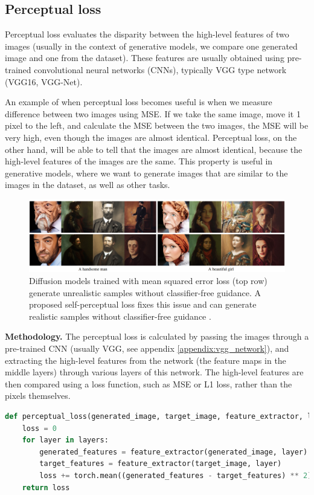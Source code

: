 \subsection{Perceptual loss}
\label{appendix:perceptual_loss}

Perceptual loss evaluates the disparity between the high-level features of two images (usually in the context of generative models, we compare one generated image and one from the dataset). These features are usually obtained using pre-trained convolutional neural networks (CNNs), typically VGG type network (VGG16, VGG-Net).

An example of when perceptual loss becomes useful is when we measure difference between two images using MSE. If we take the same image, move it 1 pixel to the left, and calculate the MSE between the two images, the MSE will be very high, even though the images are almost identical. Perceptual loss, on the other hand, will be able to tell that the images are almost identical, because the high-level features of the images are the same. This property is useful in generative models, where we want to generate images that are similar to the images in the dataset, as well as other tasks.

\begin{figure}
    \centering
    \includegraphics[width=1\textwidth]{images/appendix/perceptual_loss.png}
    \caption{Diffusion models trained with mean squared error loss (top row) generate unrealistic samples without classifier-free guidance. A proposed self-perceptual loss fixes this issue and can generate realistic samples without classifier-free guidance \cite{perceptual_loss_in_diffusion}.}
\end{figure}

\textbf{Methodology.} The perceptual loss is calculated by passing the images through a pre-trained CNN (usually VGG, see appendix \ref{appendix:vgg_network}), and extracting the high-level features from the network (the feature maps in the middle layers) through various layers of this network. The high-level features are then compared using a loss function, such as MSE or L1 loss, rather than the pixels themselves. 



\begin{lstlisting}[language=Python, caption={Example of perceptual loss implementation. Typically we don't compare the lower layers, since they contain pixel level features, and not semantics.}]
def perceptual_loss(generated_image, target_image, feature_extractor, layers):
    loss = 0
    for layer in layers:
        generated_features = feature_extractor(generated_image, layer)
        target_features = feature_extractor(target_image, layer)
        loss += torch.mean((generated_features - target_features) ** 2)
    return loss
\end{lstlisting}
